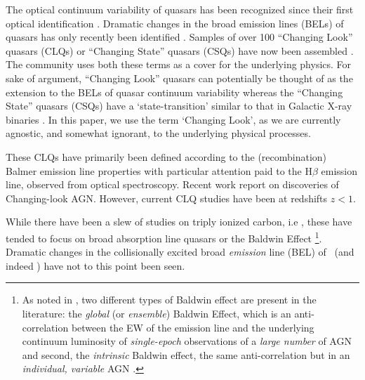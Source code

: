 \documentclass[a4paper,fleqn,usenatbib]{mnras}
\begin{document}
The optical continuum variability of quasars has been recognized since
their first optical identification
\citep[e.g.,][]{MatthewsSandage1963, MacLeod2012}.  Dramatic changes
in the broad emission lines (BELs) of quasars has only recently been
identified \citep[e.g., ][]{LaMassa2015}.  Samples of over 100
``Changing Look'' quasars (CLQs) or ``Changing State'' quasars (CSQs)
have now been assembled \citep[e.g.][]{MacLeod2019,Graham2019}. The
community uses both these terms as a cover for the underlying
physics. For sake of argument, ``Changing Look'' quasars can
potentially be thought of as the extension to the BELs of quasar
continuum variability \citep[e.g., ][]{MacLeod2012} whereas the
``Changing State'' quasars (CSQs) have a `state-transition' similar to
that in Galactic X-ray binaries \citep[][]{NodaDone2018, Ruan2019}. In
this paper, we use the term `Changing Look', as we are currently
agnostic, and somewhat ignorant, to the underlying physical processes.

These CLQs have primarily been defined according to the
(recombination) Balmer emission line properties with particular
attention paid to the H$\beta$ emission line, observed from optical
spectroscopy. Recent work \citep{Guo2019, Homan2019} report on discoveries
of \mgii Changing-look AGN. However, current CLQ studies have been at
redshifts $z<1$.

While there have been a slew of studies on triply ionized carbon, i.e
\civ, these have tended to focus on broad absorption line quasars
\citep[BAL QSOs; see Table 1][]{Hemler2019} or the Baldwin Effect
\citep[BEff; ][]{Baldwin1977, Bian2012, Jensen2016,
Hamann2017}\footnote{As noted in \citet{Rakic2017}, two different
types of Baldwin effect are present in the literature: the {\it
global} (or {\it ensemble}) Baldwin Effect, which is an
anti-correlation between the EW of the emission line and the
underlying continuum luminosity of {\it single-epoch} observations of
a {\it large number} of AGN and second, the {\it intrinsic} Baldwin
effect, the same anti-correlation but in an {\it individual, variable}
AGN \citep{PoggePeterson1992}.}.  Dramatic changes in the
collisionally excited broad {\it emission} line (BEL) of \civ\ (and
indeed \ciii) have not to this point been seen.
\end{document}
